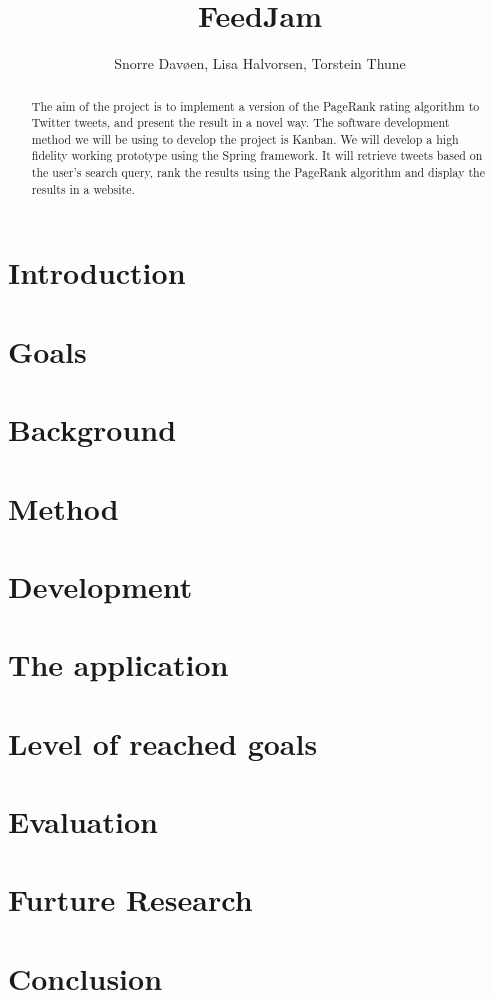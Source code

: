 \documentclass[a4paper,pt12]{article}
\begin{document}
\title{FeedJam}

\author{Snorre Davøen, Lisa Halvorsen, Torstein Thune}
 
\maketitle
\begin{abstract}
The aim of the project is to implement a version of the PageRank rating algorithm to Twitter tweets, and present the result in a novel way. The software development method we will be using to develop the project is Kanban. We will develop a high fidelity working prototype using the Spring framework. It will retrieve tweets based on the user’s search query, rank the results using the PageRank algorithm and display the results in a website.     

\end{abstract}
\newpage

\tableofcontents
\newpage

\section{Introduction}



\section{Goals}


\section{Background}



\section{Method}


\section{Development}


\section{The application}


\section{Level of reached goals}


\section{Evaluation}


\section{Furture Research}


\section{Conclusion}



%
%
\end{document}
